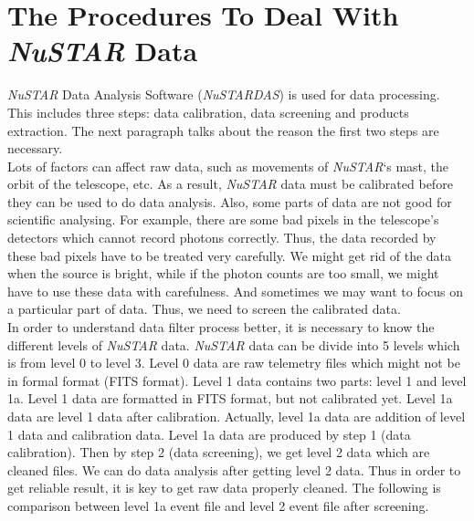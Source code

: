 \documentclass[12pt]{report}
\begin{document}
  \section{The Procedures To Deal With \textit{NuSTAR} Data}
  \textit{NuSTAR} Data Analysis Software (\textit{NuSTARDAS}) is used for data processing. This includes three steps:
    data calibration, data screening and products extraction. The next paragraph talks about the reason the 
    first two steps are necessary. \\
    \indent 
    Lots of factors can affect raw data, such as movements of \textit{NuSTAR}‘s mast, the orbit of the telescope, 
    etc. As a result, \textit{NuSTAR} data must be calibrated before they can be used to do data analysis. Also, 
    some parts 
    of data are not good for scientific analysing. For example, there are some bad pixels in the telescope's 
    detectors which cannot record photons correctly. Thus, the data recorded by these bad pixels have to be
    treated very carefully. We might get rid of the data when the source is bright, while if the photon counts
    are too small, we might have to use these data with carefulness. And sometimes we may want to focus on a 
    particular part of data. Thus, we need to screen the calibrated data. \\
    \indent 
    In order to understand data filter process better, it is necessary to know the different levels of 
    \textit{NuSTAR} data. 
    \textit{NuSTAR} data can be divide into 5 levels which is from level 0 to level 3. Level 0 data are raw 
    telemetry files
    which might not be in formal format (FITS format). Level 1 data contains two parts: level 1 and level 1a. Level 1
    data are formatted in FITS format, but not calibrated yet. Level 1a data are level 1 data after calibration. 
    Actually, level 1a data are addition of level 1 data and calibration data. Level 1a data are produced by step 1 
    (data calibration). Then by step 2 (data screening), we get level 2 data which are cleaned files. We can do data
    analysis after getting level 2 data. Thus in order to get reliable result, it is key to get raw data properly 
    cleaned. The following is comparison between level 1a event file and level 2 event file after screening.    
\end{document}
